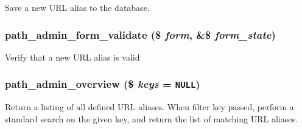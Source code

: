 Save a new URL alias to the database. \hypertarget{path_8admin_8inc_4251683f0b26edf9f54db68f4aa5e0b3}{
\subsubsection[{path\_\-admin\_\-form\_\-validate}]{\setlength{\rightskip}{0pt plus 5cm}path\_\-admin\_\-form\_\-validate (\$ {\em form}, \/  \&\$ {\em form\_\-state})}}
\label{path_8admin_8inc_4251683f0b26edf9f54db68f4aa5e0b3}


Verify that a new URL alias is valid \hypertarget{path_8admin_8inc_08b0593e253b2d3813fc7fb9514b9142}{
\subsubsection[{path\_\-admin\_\-overview}]{\setlength{\rightskip}{0pt plus 5cm}path\_\-admin\_\-overview (\$ {\em keys} = {\tt NULL})}}
\label{path_8admin_8inc_08b0593e253b2d3813fc7fb9514b9142}


Return a listing of all defined URL aliases. When filter key passed, perform a standard search on the given key, and return the list of matching URL aliases. 